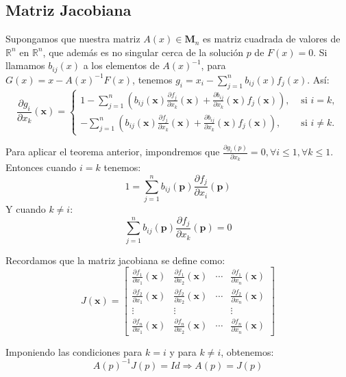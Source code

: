 \subsection{Matriz Jacobiana}

Supongamos que nuestra matriz $A(x) \in \mathbf{M}_n$ es matriz cuadrada de valores de $\mathbb{R}^n$ en $\mathbb{R}^n$, que además es no singular cerca de la solución $p$ de $F(x) = 0$. Si llamamos $b_{ij}(x)$ a los elementos de $A(x)^{-1}$, para $G(x) = x - A(x)^{-1}F(x)$, tenemos $g_i = x_i - \sum_{j=1}^{n} b_{ij}(x)f_j(x)$. Así:
\[\frac{\partial g_{i}}{\partial x_{k}}(\mathbf{x})=\left\{\begin{array}{ll}
	1-\sum_{j=1}^{n}\left(b_{i j}(\mathbf{x}) \frac{\partial f_{j}}{\partial x_{k}}(\mathbf{x})+\frac{\partial b_{i j}}{\partial x_{k}}(\mathbf{x}) f_{j}(\mathbf{x})\right), & \text { si } i=k ,\\
	-\sum_{j=1}^{n}\left(b_{i j}(\mathbf{x}) \frac{\partial f_{j}}{\partial x_{k}}(\mathbf{x})+\frac{\partial b_{i j}}{\partial x_{k}}(\mathbf{x}) f_{j}(\mathbf{x})\right), & \text { si } i \neq k .
\end{array}\right.\]

Para aplicar el teorema anterior, impondremos que $\frac{\partial g_i(p)}{\partial x_k} = 0, \forall i \leq 1, \forall k \leq 1$. Entonces cuando $i = k$ tenemos:
\[1=\sum_{j=1}^{n} b_{i j}(\mathbf{p}) \frac{\partial f_{j}}{\partial x_{i}}(\mathbf{p})\]
Y cuando $k \neq i$:
\[\sum_{j=1}^{n} b_{i j}(\mathbf{p}) \frac{\partial f_{j}}{\partial x_{k}}(\mathbf{p})=0\]

Recordamos que la matriz jacobiana se define como:
\[J(\mathbf{x})=\left[\begin{array}{cccc}
	\frac{\partial f_{1}}{\partial x_{1}}(\mathbf{x}) & \frac{\partial f_{1}}{\partial x_{2}}(\mathbf{x}) & \cdots & \frac{\partial f_{1}}{\partial x_{n}}(\mathbf{x}) \\
	\frac{\partial f_{2}}{\partial x_{1}}(\mathbf{x}) & \frac{\partial f_{2}}{\partial x_{2}}(\mathbf{x}) & \cdots & \frac{\partial f_{2}}{\partial x_{n}}(\mathbf{x}) \\
	\vdots & \vdots & & \vdots \\
	\frac{\partial f_{n}}{\partial x_{1}}(\mathbf{x}) & \frac{\partial f_{n}}{\partial x_{2}}(\mathbf{x}) & \cdots & \frac{\partial f_{n}}{\partial x_{n}}(\mathbf{x})
\end{array}\right]\]

Imponiendo las condiciones para $k = i$ y para $k \neq i$, obtenemos:
\[A(p)^{-1}J(p) = Id \Rightarrow A(p) = J(p)\]

